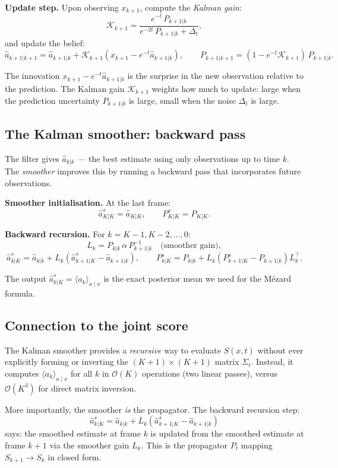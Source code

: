 \documentclass[12pt, a4paper]{article}
\def\ba{a}%
\def\bx{x}%
\def\bm#1{#1}%
\theoremstyle{definition}
\newcommand{\ba}{\bm{a}}
\newcommand{\bx}{\bm{x}}
\newcommand{\dt}{\Delta_t}
\begin{document}
\noindent\textbf{Update step.} Upon observing $x_{k+1}$, compute the
\emph{Kalman gain}:
\[
  \mathcal{K}_{k+1}
  = \frac{e^{-t}\,P_{k+1|k}}{e^{-2t}\,P_{k+1|k} + \dt},
\]
and update the belief:
\[
  \hat{a}_{k+1|k+1}
  = \hat{a}_{k+1|k}
    + \mathcal{K}_{k+1}\!\left(x_{k+1} - e^{-t}\hat{a}_{k+1|k}\right),
  \qquad
  P_{k+1|k+1}
  = (1 - e^{-t}\mathcal{K}_{k+1})\,P_{k+1|k}.
\]

The innovation $x_{k+1} - e^{-t}\hat{a}_{k+1|k}$ is the surprise in the
new observation relative to the prediction. The Kalman gain
$\mathcal{K}_{k+1}$ weights how much to update: large when the
prediction uncertainty $P_{k+1|k}$ is large, small when the noise
$\dt$ is large.

\subsection{The Kalman smoother: backward pass}

The filter gives $\hat{a}_{k|k}$ — the best estimate using only
observations up to time $k$. The \emph{smoother} improves this by
running a backward pass that incorporates future observations.

\medskip
\noindent\textbf{Smoother initialisation.} At the last frame:
\[
  \hat{a}_{K|K}^s = \hat{a}_{K|K}, \qquad P_{K|K}^s = P_{K|K}.
\]

\noindent\textbf{Backward recursion.} For $k = K-1, K-2, \ldots, 0$:
\[
  L_k = P_{k|k}\,\alpha\,P_{k+1|k}^{-1}
  \quad\text{(smoother gain)},
\]
\[
  \hat{a}_{k|K}^s
  = \hat{a}_{k|k} + L_k\!\left(\hat{a}_{k+1|K}^s - \hat{a}_{k+1|k}\right),
  \qquad
  P_{k|K}^s
  = P_{k|k} + L_k\!\left(P_{k+1|K}^s - P_{k+1|k}\right)L_k^\top.
\]

The output $\hat{a}_{k|K}^s = \langle a_k\rangle_{\ba\mid\bx}$ is the
exact posterior mean we need for the Mézard formula.

\subsection{Connection to the joint score}

The Kalman smoother provides a \emph{recursive} way to evaluate
$\bm{S}(\bx,t)$ without ever explicitly forming or inverting the
$(K+1)\times(K+1)$ matrix $\Sigma_t$. Instead, it computes
$\langle a_k\rangle_{\ba\mid\bx}$ for all $k$ in $\mathcal{O}(K)$
operations (two linear passes), versus $\mathcal{O}(K^3)$ for direct
matrix inversion.

More importantly, the smoother \emph{is} the propagator. The backward
recursion step:
\[
  \hat{a}_{k|K}^s
  = \hat{a}_{k|k} + L_k\!\left(\hat{a}_{k+1|K}^s - \hat{a}_{k+1|k}\right)
\]
says: the smoothed estimate at frame $k$ is updated from the smoothed
estimate at frame $k+1$ via the smoother gain $L_k$. This is the
propagator $P_t$ mapping $S_{k+1} \to S_k$ in closed form.
\end{document}
